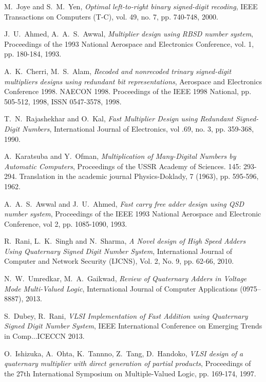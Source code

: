\documentclass[conference]{IEEEtran}
\begin{document}
\begin{thebibliography}{1}
M.~Joye and S.~M.~Yen, \emph{Optimal left-to-right binary signed-digit recoding}, IEEE Transactions on Computers (T-C), vol. 49, no. 7, pp. 740-748, 2000.

J.~U.~Ahmed, A.~A.~S.~Awwal, \emph{Multiplier design using RBSD number system}, Proceedings of the 1993 National Aerospace and Electronics Conference, vol. 1, pp. 180-184, 1993.

A.~K.~Cherri, M.~S.~Alam, \emph{Recoded and nonrecoded trinary signed-digit multipliers designs using redundant bit representations}, Aerospace and Electronics Conference 1998. NAECON 1998. Proceedings of the IEEE 1998 National, pp. 505-512, 1998, ISSN 0547-3578, 1998.

T.~N.~Rajashekhar and O.~Kal, \emph{Fast Multiplier Design using Redundant Signed-Digit Numbers}, International Journal of Electronics, vol .69, no. 3, pp. 359-368, 1990.

A.~Karatsuba and Y.~Ofman, \emph{Multiplication of Many-Digital Numbers by Automatic Computers}, Proceedings of the USSR Academy of Sciences. 145: 293-294. Translation in the academic journal Physics-Doklady, 7 (1963), pp. 595-596, 1962.

A.~A.~S.~Awwal and J.~U.~Ahmed, \emph{Fast carry free adder design using QSD number system}, Proceedings of the IEEE 1993 National Aerospace and Electronic Conference, vol 2, pp. 1085-1090, 1993.

R.~Rani, L.~K.~Singh and N.~Sharma, \emph{A Novel design of High Speed Adders Using Quaternary Signed Digit Number System}, International Journal of Computer and Network Security (IJCNS), Vol. 2, No. 9, pp. 62-66, 2010.

N.~W.~Umredkar, M.~A.~Gaikwad, \emph{Review of Quaternary Adders in Voltage Mode  Multi-Valued Logic}, International Journal of Computer Applications (0975–8887), 2013.

S.~Dubey, R.~Rani, \emph{VLSI Implementation of Fast Addition using Quaternary Signed Digit Number System}, IEEE International Conference on Emerging Trends in  Comp...ICECCN 2013.

O.~Ishizuka, A.~Ohta, K.~Tannno, Z.~Tang, D.~Handoko, \emph{VLSI design of a quaternary multiplier with direct generation of partial products}, Proceedings of the 27th International Symposium on Multiple-Valued Logic, pp. 169-174, 1997.


\end{thebibliography}
\end{document}
